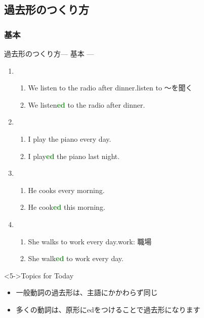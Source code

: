 \documentclass[aspectratio=169,xcolor={dvipsnames,table}]{beamer}
\newcommand{\myaudio}[1]{\href{#1}{\faVolumeUp}}
\begin{document}
\subsection{過去形のつくり方}
\subsubsection{基本}
\begin{frame}[plain]{過去形のつくり方--- 基本 ---}
 
\begin{enumerate}
 \item<1-> \begin{enumerate}
	\item We listen to the radio after dinner.\hfill{\scriptsize listen to ～を聞く\,}
	\item We listen\textcolor{ForestGreen}{\bfseries ed} to the radio after dinner.
       \end{enumerate}
 \item<2-> \begin{enumerate}
	\item I play the piano every day.
	\item I play\textcolor{ForestGreen}{\bfseries ed} the piano last night.
       \end{enumerate}
 \item<3-> \begin{enumerate}
	\item He cooks every morning.
	\item He cook\textcolor{ForestGreen}{\bfseries ed} this morning.
       \end{enumerate}

 \item<4-> \begin{enumerate}
	\item She walks to work every day.\hfill{}{\scriptsize work: 職場}
	\item She walk\textcolor{ForestGreen}{\bfseries ed} to work every day.
       \end{enumerate}
\end{enumerate}

\begin{block}<5->{Topics for Today}\small
\begin{itemize}[square]
 \item 一般動詞の過去形は、主語にかかわらず同じ
 \item 多くの動詞は、原形にedをつけることで過去形になります
\end{itemize}
\end{block}
\hfill\myaudio{./audio/025_past_do_02.mp3}

\end{frame}
\end{document}
